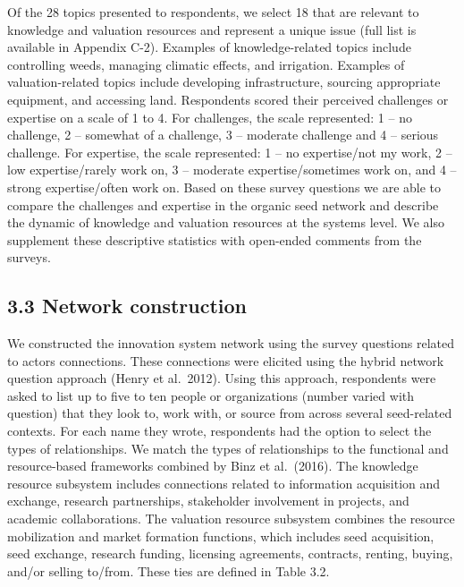 \documentclass[twoside,12pt,final]{ucthesis-CA2012}
\begin{document}
\begin{ucmainmatter}
Of the 28 topics presented to respondents, we select 18 that are
relevant to knowledge and valuation resources and represent a unique
issue (full list is available in Appendix C-2). Examples of
knowledge-related topics include controlling weeds, managing climatic
effects, and irrigation. Examples of valuation-related topics include
developing infrastructure, sourcing appropriate equipment, and accessing
land. Respondents scored their perceived challenges or expertise on a
scale of 1 to 4. For challenges, the scale represented: 1 -- no
challenge, 2 -- somewhat of a challenge, 3 -- moderate challenge and 4
-- serious challenge. For expertise, the scale represented: 1 -- no
expertise/not my work, 2 -- low expertise/rarely work on, 3 -- moderate
expertise/sometimes work on, and 4 -- strong expertise/often work on.
Based on these survey questions we are able to compare the challenges
and expertise in the organic seed network and describe the dynamic of
knowledge and valuation resources at the systems level. We also
supplement these descriptive statistics with open-ended comments from
the surveys.

\hypertarget{network-construction-1}{%
\subsection{3.3 Network construction}\label{network-construction-1}}

We constructed the innovation system network using the survey questions
related to actors\textquotesingle{} connections. These connections were elicited using
the \textquotesingle hybrid\textquotesingle{} network question approach (Henry et al.~2012). Using this
approach, respondents were asked to list up to five to ten people or
organizations (number varied with question) that they look to, work
with, or source from across several seed-related contexts. For each name
they wrote, respondents had the option to select the types of
relationships. We match the types of relationships to the functional and
resource-based frameworks combined by Binz et al.~(2016). The knowledge
resource subsystem includes connections related to information
acquisition and exchange, research partnerships, stakeholder involvement
in projects, and academic collaborations. The valuation resource
subsystem combines the resource mobilization and market formation
functions, which includes seed acquisition, seed exchange, research
funding, licensing agreements, contracts, renting, buying, and/or
selling to/from. These ties are defined in Table 3.2.
\begin{table}


\end{table}
\end{ucmainmatter}
\end{document}
